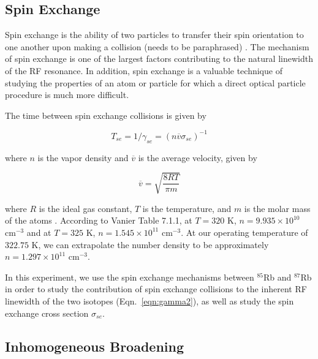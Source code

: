 \subsection{Spin Exchange}


Spin exchange is the ability of two particles to transfer their spin
orientation to one another upon making a collision (needs to be
paraphrased) \cite{bernheim}. The mechanism of spin exchange is one of
the largest factors contributing to the natural linewidth of the RF
resonance. In addition, spin exchange is a valuable technique of
studying the properties of an atom or particle for which a direct
optical particle procedure is much more difficult.

The time between spin exchange collisions is given by

\begin{equation}
T_{se} = 1/\gamma_{se} = (n\overline{v}\sigma_{se})^{-1}
\end{equation}

where $n$ is the vapor density and $\overline{v}$ is the average velocity, given by

\begin{equation}
\overline{v} = \sqrt{\frac{8RT}{\pi m}}
\end{equation}

where $R$ is the ideal gas constant, $T$ is the temperature, and $m$
is the molar mass of the atoms \cite{vanier}. According to Vanier
Table 7.1.1, at $T = 320$ K, $n = 9.935\times 10^{10}$ cm$^{-3}$ and
at $T = 325$ K, $n = 1.545\times 10^{11}$ cm$^{-3}$. At our operating
temperature of $322.75$ K, we can extrapolate the number density to be
approximately  $n = 1.297\times 10^{11}$ cm$^{-3}$. 

In this experiment, we use the spin exchange mechanisms between
$^{85}$Rb and $^{87}$Rb in order to study the contribution of spin
exchange collisions to the inherent RF linewidth of the two isotopes
(Eqn.~\ref{eqn:gamma2}), as well as study the spin exchange cross
section $\sigma_{se}$.

\subsection{Inhomogeneous Broadening}


